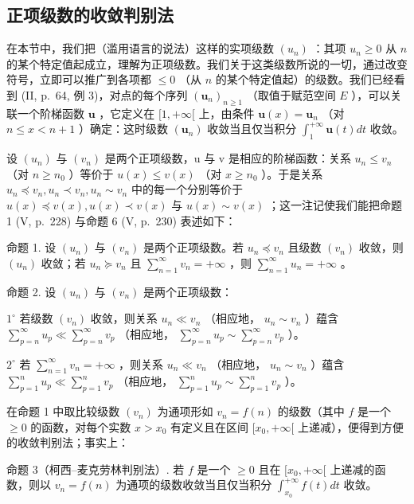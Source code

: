 \subsection{正项级数的收敛判别法}

在本节中，我们把（滥用语言的说法）这样的实项级数 \((u_{n})\) ：其项 \(u_{n} \geqslant 0\) 从 \(n\) 的某个特定值起成立，理解为正项级数。我们关于这类级数所说的一切，通过改变符号，立即可以推广到各项都 \(\leqslant 0\) （从 \(n\) 的某个特定值起）的级数。我们已经看到 (II, p.~64, 例 3)，对点的每个序列 \((\mathbf{u}_n)_{n\geqslant 1}\) （取值于赋范空间 \(E\) ），可以关联一个阶梯函数 \(\mathbf{u}\) ，它定义在 \([1, +\infty[\) 上，由条件 \(\mathbf{u}(x) = \mathbf{u}_n\) （对 \(n\leqslant x < n + 1\) ）确定：这时级数 \((\mathbf{u}_n)\) 收敛当且仅当积分 \(\int_1^{+\infty}\mathbf{u}(t)dt\) 收敛。

设 \((u_{n})\) 与 \((v_{n})\) 是两个正项级数，u 与 v 是相应的阶梯函数：关系 \(u_{n} \leqslant v_{n}\) （对 \(n \geqslant n_{0}\) ）等价于 \(u(x) \leqslant v(x)\) （对 \(x \geqslant n_{0}\) ）。于是关系 \(u_{n} \preccurlyeq v_{n}, u_{n} \prec v_{n}, u_{n} \sim v_{n}\) 中的每一个分别等价于 \(u(x) \preccurlyeq v(x), u(x) \prec v(x)\) 与 \(u(x) \sim v(x)\) ；这一注记使我们能把命题 1 (V, p.~228) 与命题 6 (V, p.~230) 表述如下：

命题 1. 设 \((u_{n})\) 与 \((v_{n})\) 是两个正项级数。若 \(u_{n} \preccurlyeq v_{n}\) 且级数 \((v_{n})\) 收敛，则 \((u_{n})\) 收敛；若 \(u_{n} \succcurlyeq v_{n}\) 且 \(\sum_{n=1}^{\infty} v_{n} = +\infty\) ，则 \(\sum_{n=1}^{\infty} u_{n} = +\infty\) 。

命题 2. 设 \((u_{n})\) 与 \((v_{n})\) 是两个正项级数：

\(1^{\circ}\) 若级数 \((v_{n})\) 收敛，则关系 \(u_{n} \ll v_{n}\) （相应地， \(u_{n} \sim v_{n}\) ）蕴含 \(\sum_{p=n}^{\infty} u_{p} \ll \sum_{p=n}^{\infty} v_{p}\) （相应地， \(\sum_{p=n}^{\infty} u_{p} \sim \sum_{p=n}^{\infty} v_{p}\) ）。

\(2^{\circ}\) 若 \(\sum_{n=1}^{\infty} v_n = +\infty\) ，则关系 \(u_n \ll v_n\) （相应地， \(u_n \sim v_n\) ）蕴含 \(\sum_{p=1}^{n} u_p \ll \sum_{p=1}^{n} v_p\) （相应地， \(\sum_{p=1}^{n} u_p \sim \sum_{p=1}^{n} v_p\) ）。

在命题 1 中取比较级数 \((v_{n})\) 为通项形如 \(v_{n} = f(n)\) 的级数（其中 \(f\) 是一个 \(\geqslant 0\) 的函数，对每个实数 \(x > x_0\) 有定义且在区间 \([x_0, +\infty[\) 上递减），便得到方便的收敛判别法；事实上：

命题 3（柯西–麦克劳林判别法）. 若 \(f\) 是一个 \(\geqslant 0\) 且在 \([x_0, +\infty[\) 上递减的函数，则以 \(v_n = f(n)\) 为通项的级数收敛当且仅当积分 \(\int_{x_0}^{+\infty} f(t) dt\) 收敛。

